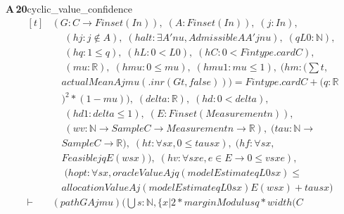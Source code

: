 \documentclass[conference]{IEEEtran}
\theoremstyle{definition}
\newcommand{\lean}[1]{\textsf{\footnotesize #1}}
\begin{document}
\noindent\textbf{A\,20}\quad\lean{cyclic\_value\_confidence}
{\footnotesize\[ \begin{aligned}[t]
&(\mathit{G} : \mathit{C} \to \mathit{Finset} (\mathit{I} \mathit{n})),\; (\mathit{A} : \mathit{Finset} (\mathit{I} \mathit{n})),\; (\mathit{j} : \mathit{I} \mathit{n}),\\
&\quad \; (\mathit{hj} : \mathit{j} \notin \mathit{A}),\; (\mathit{halt} : \exists \mathit{A'} \mathit{nu},\mathit{Admissible} \mathit{A} \mathit{A'} \mathit{j} \mathit{nu}),\; (\mathit{q} \mathit{L0} : \mathbb{N} ),\\
&\quad \; (\mathit{hq} : 1 \leq \mathit{q}),\; (\mathit{hL} : 0 < \mathit{L0}),\; (\mathit{hC} : 0 < \mathit{Fintype}.\mathit{card} \mathit{C}),\\
&\quad \; (\mathit{mu} : \mathbb{R} ),\; (\mathit{hmu} : 0 \leq \mathit{mu}),\; (\mathit{hmu1} : \mathit{mu} \leq 1),\; (\mathit{hm} : (\textstyle\sum \mathit{t},\\
&\quad \mathit{actualMean} \mathit{A} \mathit{j} \mathit{mu} (.\mathit{inr} (\mathit{G} \mathit{t},\mathit{false}))) = \mathit{Fintype}.\mathit{card} \mathit{C}+(\mathit{q}:\mathbb{R}\\
&\quad )^{2}*(1-\mathit{mu})),\; (\mathit{delta} : \mathbb{R} ),\; (\mathit{hd} : 0 < \mathit{delta}),\\
&\quad \; (\mathit{hd1} : \mathit{delta} \leq 1),\; (\mathit{E} : \mathit{Finset} (\mathit{Measurement} \mathit{n})),\\
&\quad \; (\mathit{w} \mathit{v} : \mathbb{N} \to \mathit{Sample} \mathit{C} \to \mathit{Measurement} \mathit{n} \to \mathbb{R} ),\; (\mathit{tau} : \mathbb{N} \to\\
&\quad \mathit{Sample} \mathit{C} \to \mathbb{R} ),\; (\mathit{ht} : \forall \mathit{s} \mathit{x},0 \leq \mathit{tau} \mathit{s} \mathit{x}),\; (\mathit{hf} : \forall \mathit{s} \mathit{x},\\
&\quad \mathit{Feasible} \mathit{j} \mathit{q} \mathit{E} (\mathit{w} \mathit{s} \mathit{x})),\; (\mathit{hv} : \forall \mathit{s} \mathit{x} \mathit{e},\mathit{e} \in \mathit{E} \to 0 \leq \mathit{v} \mathit{s} \mathit{x} \mathit{e}),\\
&\quad \; (\mathit{hopt} : \forall \mathit{s} \mathit{x},\mathit{oracleValue} \mathit{A} \mathit{j} \mathit{q} (\mathit{modelEstimate} \mathit{q} \mathit{L0} \mathit{s} \mathit{x}) \leq\\
&\quad \mathit{allocationValue} \mathit{A} \mathit{j} (\mathit{modelEstimate} \mathit{q} \mathit{L0} \mathit{s} \mathit{x}) \mathit{E} (\mathit{w} \mathit{s} \mathit{x})+\mathit{tau} \mathit{s} \mathit{x})\\
\vdash\;&(\mathit{path} \mathit{G} \mathit{A} \mathit{j} \mathit{mu}) (⋃ \mathit{s} : \mathbb{N} ,\{ \mathit{x} | 2*\mathit{marginModulus} \mathit{q}*\mathit{width} (\mathit{C}
\end{aligned} \]}
\end{document}
